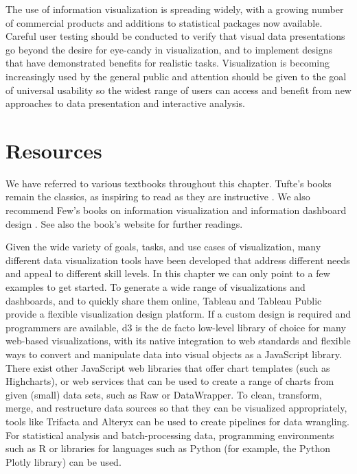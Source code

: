 \documentclass[]{krantz}
\begin{document}
The use of information visualization is spreading widely, with a growing
number of commercial products and additions to statistical packages now
available. Careful user testing should be conducted to verify that
visual data presentations go beyond the desire for eye-candy in
visualization, and to implement designs that have demonstrated benefits
for realistic tasks. Visualization is becoming increasingly used by the
general public and attention should be given to the goal of universal
usability so the widest range of users can access and benefit from new
approaches to data presentation and interactive analysis.

\hypertarget{sec:viz-6}{\section{Resources}\label{sec:viz-6}}

We have referred to various textbooks throughout this chapter. Tufte's
books remain the classics, as inspiring to read as they are instructive
\citep{edward2001visual, edward2006beauty}. We also recommend Few's
books on information visualization \citep{few2009now} and information
dashboard design \citep{few2013information}. See also the book's website
for further readings.

Given the wide variety of goals, tasks, and use cases of visualization,
many different data visualization tools have been developed that address
different needs and appeal to different skill levels. In this chapter we
can only point to a few examples to get started. To generate a wide
range of visualizations and dashboards, and to quickly share them
online, Tableau and Tableau Public provide a flexible visualization
design platform. If a custom design is required and programmers are
available, d3 is the de facto low-level library of choice for many
web-based visualizations, with its native integration to web standards
and flexible ways to convert and manipulate data into visual objects as
a JavaScript library. There exist other JavaScript web libraries that
offer chart templates (such as Highcharts), or web services that can be
used to create a range of charts from given (small) data sets, such as
Raw or DataWrapper. To clean, transform, merge, and restructure data
sources so that they can be visualized appropriately, tools like
Trifacta and Alteryx can be used to create pipelines for data wrangling.
For statistical analysis and batch-processing data, programming
environments such as R or libraries for languages such as Python (for
example, the Python Plotly library) can be used.
\end{document}
